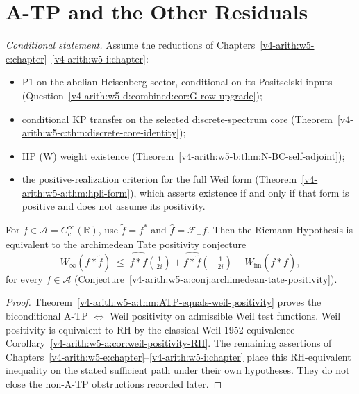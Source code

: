 \section{A-TP and the Other Residuals}
\label{v4-arith:w5-synth:single-residual}

\begin{theorem}
\label{v4-arith:w5-synth:thm:RH-equiv-ATP}
\emph{Conditional statement.} Assume the reductions of Chapters~\ref{v4-arith:w5-e:chapter}--\ref{v4-arith:w5-i:chapter}:
\begin{itemize}
\item P1 on the abelian Heisenberg sector, conditional on its
Positselski inputs
(Question~\ref{v4-arith:w5-d:combined:cor:G-row-upgrade});
\item conditional KP transfer on the selected discrete-spectrum core
(Theorem~\ref{v4-arith:w5-c:thm:discrete-core-identity});
\item HP (W) weight existence
(Theorem~\ref{v4-arith:w5-b:thm:N-BC-self-adjoint});
\item the positive-realization criterion for the full Weil form
(Theorem~\ref{v4-arith:w5-a:thm:hpli-form}), which asserts existence if and
only if that form is positive and does not assume its positivity.
\end{itemize}
For \(f\in\mathscr A=C_c^\infty(\mathbb R)\), use
\(\widetilde f=f^*\) and \(\widehat f=\mathcal F_+f\).
Then the Riemann Hypothesis is equivalent to the archimedean Tate
positivity conjecture
\begin{equation}
\label{v4-arith:w5-synth:eq:ATP}
W_{\infty}(f*\widetilde{f})\;\leq\;
\widehat{f*\widetilde{f}}(\tfrac{1}{2i})+
\widehat{f*\widetilde{f}}(-\tfrac{1}{2i})-
W_{\mathrm{fin}}(f*\widetilde{f}),
\end{equation}
for every \(f\in\mathscr A\)
(Conjecture~\ref{v4-arith:w5-a:conj:archimedean-tate-positivity}).
\end{theorem}

\begin{proof}
Theorem~\ref{v4-arith:w5-a:thm:ATP-equals-weil-positivity} proves the
biconditional A-TP \(\Leftrightarrow\) Weil positivity on admissible
Weil test functions. Weil positivity is equivalent to RH by the
classical Weil 1952 equivalence
Corollary~\ref{v4-arith:w5-a:cor:weil-positivity-RH}. The remaining assertions
of Chapters~\ref{v4-arith:w5-e:chapter}--\ref{v4-arith:w5-i:chapter} place this RH-equivalent inequality on the stated
sufficient path under their own hypotheses. They do not close the
non-A-TP obstructions recorded later.
\end{proof}

